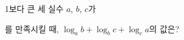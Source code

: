 1보다 큰 세 실수 $a$, $b$, $c$가 \par\smallskip{}\par\smallskip\noindent 를 만족시킬 때, $\log_a b+\log_b c+\log_c a$의 값은?
